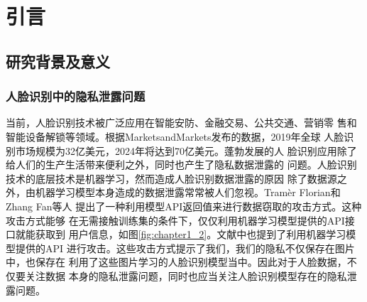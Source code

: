 
\chapter{引言}

\section{研究背景及意义}

\subsection{人脸识别中的隐私泄露问题}
当前，人脸识别技术被广泛应用在智能安防、金融交易、公共交通、营销零
售和智能设备解锁等领域。根据MarketsandMarkets发布的数据，2019年全球
人脸识别市场规模为32亿美元，2024年将达到70亿美元\cite{marketsmarkets2019}。蓬勃发展的人
脸识别应用除了给人们的生产生活带来便利之外，同时也产生了隐私数据泄露的
问题\cite{baiduwangxun2020,nandugeren2020,jiaziguangnian2020}。人脸识别技术的底层技术是机器学习，然而造成人脸识别数据泄露的原因
除了数据源之外，由机器学习模型本身造成的数据泄露常常被人们忽视。Tram\`{e}r Florian和Zhang Fan等人\cite{10.5555/3241094.3241142}
提出了一种利用模型API返回值来进行数据窃取的攻击方式。这种攻击方式能够
在无需接触训练集的条件下，仅仅利用机器学习模型提供的API接口就能获取到
用户信息，如图\ref{fig:chapter1_2}。文献\cite{Fredrikson2015}中也提到了利用机器学习模型提供的API
进行攻击。这些攻击方式提示了我们，我们的隐私不仅保存在图片中，也保存在
利用了这些图片学习的人脸识别模型当中。因此对于人脸数据，不仅要关注数据
本身的隐私泄露问题，同时也应当关注人脸识别模型存在的隐私泄露问题。

